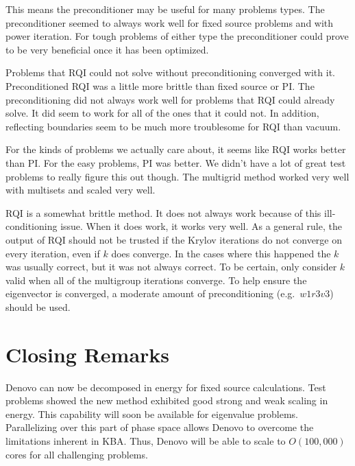 

This means the preconditioner may be useful for many problems types. The preconditioner seemed to always work well for fixed source problems and with power iteration. For tough problems of either type the preconditioner could prove to be very beneficial once it has been optimized.  

Problems that RQI could not solve without preconditioning converged with it. Preconditioned RQI was a little more brittle than fixed source or PI. The preconditioning did not always work well for problems that RQI could already solve. It did seem to work for all of the ones that it could not. In addition, reflecting boundaries seem to be much more troublesome for RQI than vacuum. 

For the kinds of problems we actually care about, it seems like RQI works better than PI. For the easy problems, PI was better. We didn't have a lot of great test problems to really figure this out though. The multigrid method worked very well with multisets and scaled very well. 

RQI is a somewhat brittle method. It does not always work because of this ill-conditioning issue. When it does work, it works very well. As a general rule, the output of RQI should not be trusted if the Krylov iterations do not converge on every iteration, even if $k$ does converge. In the cases where this happened the $k$ was usually correct, but it was not always correct. To be certain, only consider $k$ valid when all of the multigroup iterations converge. To help ensure the eigenvector is converged, a moderate amount of preconditioning (e.g.\ $w1r3v3$) should be used. 

\section{Closing Remarks}
Denovo can now be decomposed in energy for fixed source calculations. Test problems showed the new method exhibited good strong and weak scaling in energy. This capability will soon be available for eigenvalue problems. Parallelizing over this part of phase space allows Denovo to overcome the limitations inherent in KBA. Thus, Denovo will be able to scale to $O(100,000)$ cores for all challenging problems. 

